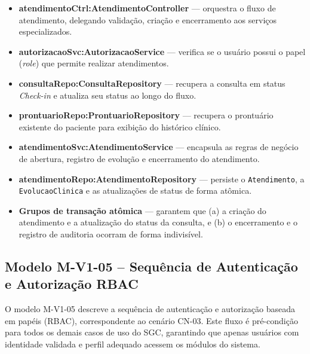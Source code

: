\begin{itemize}
    \item \textbf{atendimentoCtrl:AtendimentoController} --- orquestra o fluxo de atendimento, delegando validação, criação e encerramento aos serviços especializados.
    \item \textbf{autorizacaoSvc:AutorizacaoService} --- verifica se o usuário possui o papel (\textit{role}) que permite realizar atendimentos.
    \item \textbf{consultaRepo:ConsultaRepository} --- recupera a consulta em status \textit{Check-in} e atualiza seu status ao longo do fluxo.
    \item \textbf{prontuarioRepo:ProntuarioRepository} --- recupera o prontuário existente do paciente para exibição do histórico clínico.
    \item \textbf{atendimentoSvc:AtendimentoService} --- encapsula as regras de negócio de abertura, registro de evolução e encerramento do atendimento.
    \item \textbf{atendimentoRepo:AtendimentoRepository} --- persiste o \texttt{Atendimento}, a \texttt{EvolucaoClinica} e as atualizações de status de forma atômica.
    \item \textbf{Grupos de transação atômica} --- garantem que (a) a criação do atendimento e a atualização do status da consulta, e (b) o encerramento e o registro de auditoria ocorram de forma indivisível.
\end{itemize}

\subsection{Modelo M-V1-05 -- Sequência de Autenticação e Autorização RBAC}

O modelo M-V1-05 descreve a sequência de autenticação e autorização baseada em papéis (RBAC), correspondente ao cenário CN-03. Este fluxo é pré-condição para todos os demais casos de uso do SGC, garantindo que apenas usuários com identidade validada e perfil adequado acessem os módulos do sistema.

